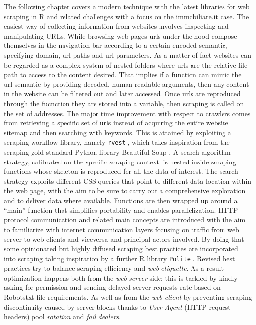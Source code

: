 \documentclass[
  12pt,
  a4paper,
  oneside]{book}
\newcommand{\passthrough}[1]{#1}
\theoremstyle{definition}
\theoremstyle{definition}
\theoremstyle{definition}
\theoremstyle{remark}
\begin{document}
The following chapter covers a modern technique with the latest libraries for web scraping in R and related challenges with a focus on the immobiliare.it case. The easiest way of collecting information from websites involves inspecting and manipulating URLs. While browsing web pages urls under the hood compose themselves in the navigation bar according to a certain encoded semantic, specifying domain, url paths and url parameters. As a matter of fact websites can be regarded as a complex system of nested folders where urls are the relative file path to access to the content desired. That implies if a function can mimic the url semantic by providing decoded, human-readable arguments, then any content in the website can be filtered out and later accessed.
Once urls are reproduced through the fucnction they are stored into a variable, then scraping is called on the set of addresses.
The major time improvement with respect to crawlers comes from retrieving a specific set of urls instead of acquiring the entire website sitemap and then searching with keywords.
This is attained by exploiting a scraping workflow library, namely \passthrough{\lstinline!rvest!} \citet{rvest}, which takes inspiration from the scraping gold standard Python library Beautiful Soup \citet{Beautifulsoup}. A search algorithm strategy, calibrated on the specific scraping context, is nested inside scraping functions whose skeleton is reproduced for all the data of interest. The search strategy exploits different CSS queries that point to different data location within the web page, with the aim to be sure to carry out a comprehensive exploration and to deliver data where available. Functions are then wrapped up around a ``main'' function that simplifies portability and enables parallelization.
HTTP protocol communication and related main concepts are introduced with the aim to familiarize with internet communication layers focusing on traffic from web server to web clients and viceversa and principal actors involved.
By doing that some opinionated but highly diffused scraping best practices are incorporated into scraping taking inspiration by a further R library \passthrough{\lstinline!Polite!} \citet{polite}. Revised best practices try to balance scraping efficiency and \emph{web etiquette}. As a result optimization happens both from the \emph{web server} side; this is tackled by kindly asking for permission and sending delayed server requests rate based on Robotstxt file requirements. As well as from the \emph{web client} by preventing scraping discontinuity caused by server blocks thanks to \emph{User Agent} (HTTP request headers) pool \emph{rotation} and \emph{fail dealers}.
\end{document}

